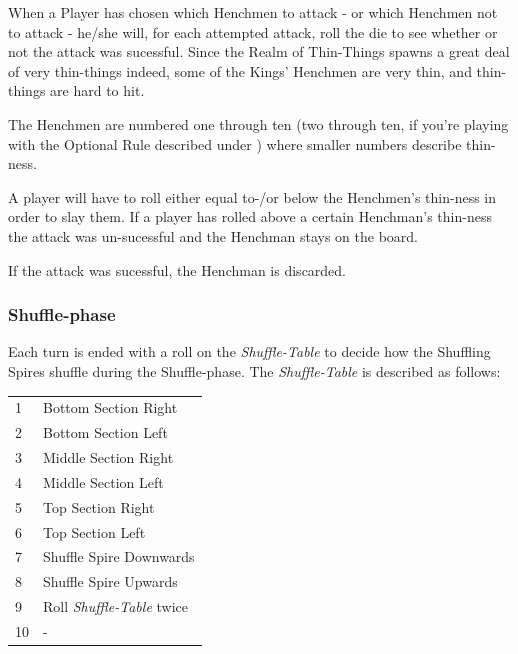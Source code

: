\documentclass[11pt,twocolumn]{article}
\begin{document}
\noindent
When a Player has chosen which Henchmen to attack - or which Henchmen not to attack - he/she will, for each attempted attack, roll the die to see whether or not the attack was sucessful.
Since the Realm of Thin-Things spawns a great deal of very thin-things indeed, some of the Kings' Henchmen are very thin, and thin-things are hard to hit.

The Henchmen are numbered one through ten (two through ten, if you're playing with the Optional Rule described under ) where smaller numbers describe thin-ness.

A player will have to roll either equal to-/or below the Henchmen's thin-ness in order to slay them.
If a player has rolled above a certain Henchman's thin-ness the attack was un-sucessful and the Henchman stays on the board.

If the attack was sucessful, the Henchman is discarded.

\subsubsection{Shuffle-phase}
\label{sec:playingshufflespires_shufflephase}
Each turn is ended with a roll on the \textit{Shuffle-Table} to decide how the Shuffling Spires shuffle during the Shuffle-phase.
The \textit{Shuffle-Table} is described as follows:

\begin{tabular}{ l l }
	1 & Bottom Section Right \\
	2 & Bottom Section Left \\
	3 & Middle Section Right \\
	4 & Middle Section Left \\
	5 & Top Section Right \\
	6 & Top Section Left \\
	7 & Shuffle Spire Downwards\\
	8 & Shuffle Spire Upwards \\
	9 &  Roll \textit{Shuffle-Table} twice\\
	10 & - \\
\end{tabular}
\end{document}
